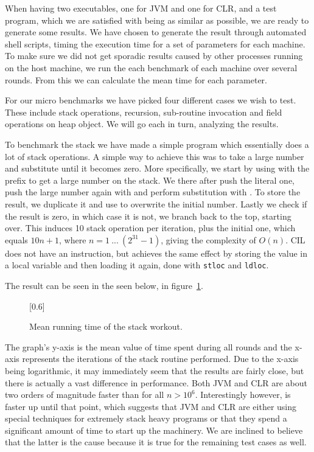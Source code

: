 When having two executables, one for JVM and one for CLR, and a \thename{} test
program, which we are satisfied with being as similar as possible, we are ready
to generate some results. We have chosen to generate the result through
automated shell scripts, timing the execution time for a set of parameters for
each machine. To make sure we did not get sporadic results caused by other
processes running on the host machine, we run the each benchmark of each machine
over several rounds. From this we can calculate the mean time for each
parameter.

For our micro benchmarks we have picked four different cases we wish to
test. These include stack operations, recursion, sub-routine invocation and
field operations on heap object. We will go each in turn, analyzing the results.


To benchmark the stack we have made a simple program which essentially does a
lot of stack operations. A simple way to achieve this was to take a large number
and substitute until it becomes zero. More specifically, we start by using
 with the  prefix to get a large number on the
stack. We there after push the literal one, push the large number again with
 and perform substitution with . To store the
result, we duplicate it and use  to overwrite the initial
number. Lastly we check if the result is zero, in which case it is not, we
branch back to the top, starting over. This induces 10 stack operation per
iteration, plus the initial one, which equals $10n + 1$, where
$n = 1\ ...\ (2^{31} -1)$, giving the complexity of $O(n)$. CIL does not have an
 instruction, but achieves the same effect by storing the
value in a local variable and then loading it again, done with {\tt stloc} and
{\tt ldloc}.

The result can be seen in the seen below, in
figure~\ref{fig:eval:benchmark:stack}.
\begin{figure}[H]
  \centering
  \scalebox{0.8}[0.6]{}
  \caption{Mean running time of the stack workout.}
\label{fig:eval:benchmark:stack}
\end{figure}

The graph's y-axis is the mean value of time spent during all rounds and the
x-axis represents the iterations of the stack routine performed. Due to the
x-axis being logarithmic, it may immediately seem that the results are fairly
close, but there is actually a vast difference in performance. Both JVM and CLR
are about two orders of magnitude faster than \thename{} for all
$n>10^6$. Interestingly however, \thename{} is faster up until that point, which
suggests that JVM and CLR are either using special techniques for extremely
stack heavy programs or that they spend a significant amount of time to start up
the machinery. We are inclined to believe that the latter is the cause because
it is true for the remaining test cases as well.

